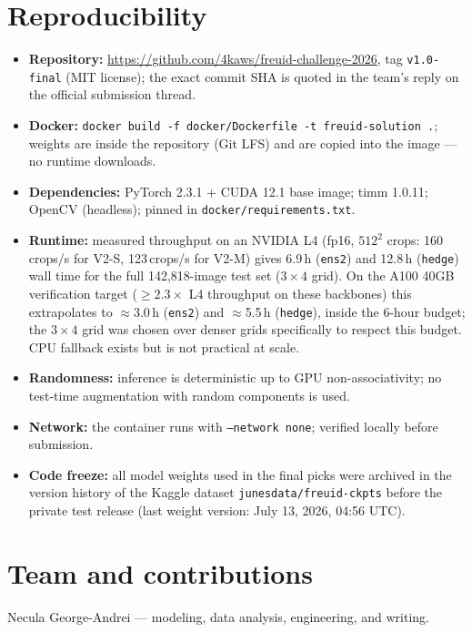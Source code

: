 \documentclass[11pt,a4paper]{article}
\begin{document}
\section{Reproducibility}
\label{sec:repro}
\begin{itemize}[noitemsep]
  \item \textbf{Repository:} \url{https://github.com/4kaws/freuid-challenge-2026},
        tag \texttt{v1.0-final} (MIT license); the exact commit SHA is quoted in the
        team's reply on the official submission thread.
  \item \textbf{Docker:} \texttt{docker build -f docker/Dockerfile -t freuid-solution .};
        weights are inside the repository (Git LFS) and are copied into the image ---
        no runtime downloads.
  \item \textbf{Dependencies:} PyTorch 2.3.1 + CUDA 12.1 base image; timm 1.0.11;
        OpenCV (headless); pinned in \texttt{docker/requirements.txt}.
  \item \textbf{Runtime:} measured throughput on an NVIDIA L4 (fp16, $512^2$ crops:
        160\,crops/s for V2-S, 123\,crops/s for V2-M) gives 6.9\,h (\texttt{ens2}) and
        12.8\,h (\texttt{hedge}) wall time for the full 142{,}818-image test set
        ($3{\times}4$ grid). On the A100 40GB verification target ($\geq 2.3\times$ L4
        throughput on these backbones) this extrapolates to $\approx$3.0\,h
        (\texttt{ens2}) and $\approx$5.5\,h (\texttt{hedge}), inside the 6-hour budget;
        the $3{\times}4$ grid was chosen over denser grids specifically to respect this
        budget. CPU fallback exists but is not practical at scale.
  \item \textbf{Randomness:} inference is deterministic up to GPU non-associativity;
        no test-time augmentation with random components is used.
  \item \textbf{Network:} the container runs with \texttt{--network none}; verified
        locally before submission.
  \item \textbf{Code freeze:} all model weights used in the final picks were archived
        in the version history of the Kaggle dataset \texttt{junesdata/freuid-ckpts}
        before the private test release (last weight version: July 13, 2026, 04:56 UTC).
\end{itemize}

\section{Team and contributions}
Necula George-Andrei --- modeling, data analysis, engineering, and writing.
\end{document}
